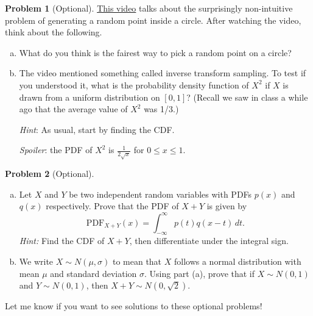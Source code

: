 \documentclass[11pt,oneside]{amsart}
\theoremstyle{definition}
\newtheorem{problem}{Problem}
\begin{document}

    \begin{problem}[Optional]
        \href{https://www.youtube.com/watch?v=4y_nmpv-9lI}{This video} talks about the surprisingly non-intuitive problem of generating a random point inside a circle. After watching the video, think about the following.
        \begin{enumerate}[(a)]
            \item What do you think is the fairest way to pick a random point on a circle?
            \item The video mentioned something called inverse transform sampling. To test if you understood it, what is the probability density function of $X^2$ if $X$ is drawn from a uniform distribution on $[0,1]$? (Recall we saw in class a while ago that the average value of $X^2$ was 1/3.)
            
            \emph{Hint}: As usual, start by finding the CDF.

            \emph{Spoiler}: the PDF of $X^2$ is $\frac 1{2\sqrt x}$ for $0\leq x\leq 1$.
        \end{enumerate}
    \end{problem}

    \begin{problem}[Optional]
        \leavevmode\begin{enumerate}[(a)]
            \item Let $X$ and $Y$ be two independent random variables with PDFs $p(x)$ and $q(x)$ respectively. Prove that the PDF of $X+Y$ is given by
            \[\mathrm{PDF}_{X+Y}(x)=\int_{-\infty}^\infty p(t)q(x-t)\,dt.\]
            \emph{Hint:} Find the CDF of $X+Y$, then differentiate under the integral sign.
            \item We write $X\sim N(\mu,\sigma)$ to mean that $X$ follows a normal distribution with mean $\mu$ and standard deviation $\sigma$. Using part (a), prove that if $X\sim N(0,1)$ and $Y\sim N(0,1)$, then $X+Y\sim N(0,\sqrt 2)$.
        \end{enumerate}
    \end{problem}
    \begin{solution}
        Let me know if you want to see solutions to these optional problems!
    \end{solution}
\end{document}
